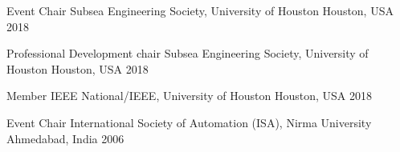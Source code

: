 





\begin{cvhonors}
	
	\cvhonor
	{Event Chair} %
	{Subsea Engineering Society, University of Houston} %
	{Houston, USA} %
	{2018} %
\end{cvhonors}

\begin{cvhonors}	
	\cvhonor
	{Professional Development chair} %
	{Subsea Engineering Society, University of Houston} %
	{Houston, USA} %
	{2018} %
\end{cvhonors}

\begin{cvhonors}
	\cvhonor
	{Member} %
	{IEEE National/IEEE, University of Houston} %
	{Houston, USA} %
	{2018} %
\end{cvhonors}

\begin{cvhonors}
\cvhonor
	{Event Chair} %
	{International Society of Automation (ISA), Nirma University} %
	{Ahmedabad, India} %
	{2006} %
\end{cvhonors}


